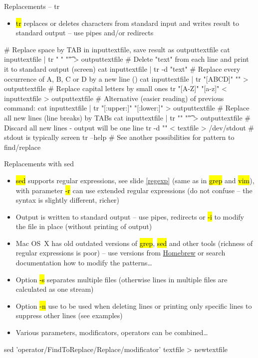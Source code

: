 \documentclass[compress, ucs, xelatex, 11pt, xcolor=svgnames,
  hyperref={
    bookmarks=true,
    unicode=true,
    colorlinks=true,
    pdftitle={Linux, command line and MetaCentrum},
    plainpages=false,
    pdfauthor={Vojtech Zeisek},
    pdfsubject={Course about use of Linux command line, writing shell scripts and using MetaCentrum of CESNET},
    pdfcreator={XeLaTeX},
    pdfkeywords={Linux, GNU, BASH, shell, command line, MetaCentrum},
    linkcolor=DarkRed,
    anchorcolor=DarkBlue,
    citecolor=Indigo,
    filecolor=NavyBlue,
    menucolor=DarkMagenta,
    urlcolor=DarkBlue,
    pdftex},
  url={hyphens, lowtilde} %
  ]{beamer}
\renewcommand{\texttt}[1]{\hl{\ttfamily #1}}
\begin{document}
\begin{frame}[fragile]{Replacements -- tr}
  \begin{itemize}
    \item \texttt{tr} replaces or deletes characters from standard input and writes result to standard output -- use pipes and/or redirects
  \end{itemize}
  \begin{bashcode}
    # Replace space by TAB in inputtextfile, save result as outputtextfile
    cat inputtextfile | tr " " "\t" > outputtextfile
    # Delete "text" from each line and print it to standard output (screen)
    cat inputtextfile | tr -d "text"
    # Replace every occurrence of A, B, C or D by a new line (\n)
    cat inputtextfile | tr "[ABCD]" "\n" > outputtextfile
    # Replace capital letters by small ones
    tr "[A-Z]" "[a-z]" < inputtextfile > outputtextfile
    # Alternative (easier reading) of previous command:
    cat inputtextfile | tr "[:upper:]" "[:lower:]" > outputtextfile
    # Replace all new lines (line breaks) by TABs
    cat inputtextfile | tr "\n" "\t"  > outputtextfile
    # Discard all new lines - output will be one line
    tr -d "\n" < textfile > /dev/stdout # stdout is typically screen
    tr --help # See another possibilities for pattern to find/replace
  \end{bashcode}
\end{frame}

\begin{frame}[fragile]{Replacements with sed}
  \begin{itemize}
    \item \texttt{sed} supports regular expressions, see slide \ref{regexp} (same as in \texttt{grep} and \texttt{vim}), with parameter \texttt{-r} can use extended regular expressions (do not confuse -- the syntax is slightly different, richer)
    \item Output is written to standard output -- use pipes, redirects or \texttt{-i} to modify the file in place (without printing of output)
    \item Mac OS~X has old outdated versions of \texttt{grep}, \texttt{sed} and other tools (richness of regular expressions is poor) -- use versions from \href{http://brew.sh/}{Homebrew} or search documentation how to modify the patterns\ldots
    \item Option \texttt{-s} separates multiple files (otherwise lines in multiple files are calculated as one stream)
    \item Option \texttt{-n} use to be used when deleting lines or printing only specific lines to suppress other lines (see examples)
    \item Various parameters, modificators, operators can be combined\ldots
  \end{itemize}
  \begin{bashcode}
    sed 'operator/FindToReplace/Replace/modificator' textfile > newtextfile
  \end{bashcode}
  \vfill
\end{frame}
\end{document}
